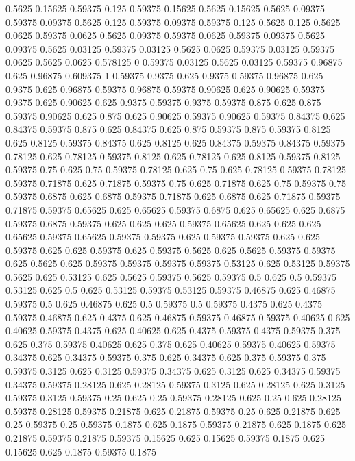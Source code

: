 0.5625 0.15625
0.59375 0.125
0.59375 0.15625
0.5625 0.15625
0.5625 0.09375
0.59375 0.09375
0.5625 0.125
0.59375 0.09375
0.59375 0.125
0.5625 0.125
0.5625 0.0625
0.59375 0.0625
0.5625 0.09375
0.59375 0.0625
0.59375 0.09375
0.5625 0.09375
0.5625 0.03125
0.59375 0.03125
0.5625 0.0625
0.59375 0.03125
0.59375 0.0625
0.5625 0.0625
0.578125 0
0.59375 0.03125
0.5625 0.03125
0.59375 0.96875
0.625 0.96875
0.609375 1
0.59375 0.9375
0.625 0.9375
0.59375 0.96875
0.625 0.9375
0.625 0.96875
0.59375 0.96875
0.59375 0.90625
0.625 0.90625
0.59375 0.9375
0.625 0.90625
0.625 0.9375
0.59375 0.9375
0.59375 0.875
0.625 0.875
0.59375 0.90625
0.625 0.875
0.625 0.90625
0.59375 0.90625
0.59375 0.84375
0.625 0.84375
0.59375 0.875
0.625 0.84375
0.625 0.875
0.59375 0.875
0.59375 0.8125
0.625 0.8125
0.59375 0.84375
0.625 0.8125
0.625 0.84375
0.59375 0.84375
0.59375 0.78125
0.625 0.78125
0.59375 0.8125
0.625 0.78125
0.625 0.8125
0.59375 0.8125
0.59375 0.75
0.625 0.75
0.59375 0.78125
0.625 0.75
0.625 0.78125
0.59375 0.78125
0.59375 0.71875
0.625 0.71875
0.59375 0.75
0.625 0.71875
0.625 0.75
0.59375 0.75
0.59375 0.6875
0.625 0.6875
0.59375 0.71875
0.625 0.6875
0.625 0.71875
0.59375 0.71875
0.59375 0.65625
0.625 0.65625
0.59375 0.6875
0.625 0.65625
0.625 0.6875
0.59375 0.6875
0.59375 0.625
0.625 0.625
0.59375 0.65625
0.625 0.625
0.625 0.65625
0.59375 0.65625
0.59375 0.59375
0.625 0.59375
0.59375 0.625
0.625 0.59375
0.625 0.625
0.59375 0.625
0.59375 0.5625
0.625 0.5625
0.59375 0.59375
0.625 0.5625
0.625 0.59375
0.59375 0.59375
0.59375 0.53125
0.625 0.53125
0.59375 0.5625
0.625 0.53125
0.625 0.5625
0.59375 0.5625
0.59375 0.5
0.625 0.5
0.59375 0.53125
0.625 0.5
0.625 0.53125
0.59375 0.53125
0.59375 0.46875
0.625 0.46875
0.59375 0.5
0.625 0.46875
0.625 0.5
0.59375 0.5
0.59375 0.4375
0.625 0.4375
0.59375 0.46875
0.625 0.4375
0.625 0.46875
0.59375 0.46875
0.59375 0.40625
0.625 0.40625
0.59375 0.4375
0.625 0.40625
0.625 0.4375
0.59375 0.4375
0.59375 0.375
0.625 0.375
0.59375 0.40625
0.625 0.375
0.625 0.40625
0.59375 0.40625
0.59375 0.34375
0.625 0.34375
0.59375 0.375
0.625 0.34375
0.625 0.375
0.59375 0.375
0.59375 0.3125
0.625 0.3125
0.59375 0.34375
0.625 0.3125
0.625 0.34375
0.59375 0.34375
0.59375 0.28125
0.625 0.28125
0.59375 0.3125
0.625 0.28125
0.625 0.3125
0.59375 0.3125
0.59375 0.25
0.625 0.25
0.59375 0.28125
0.625 0.25
0.625 0.28125
0.59375 0.28125
0.59375 0.21875
0.625 0.21875
0.59375 0.25
0.625 0.21875
0.625 0.25
0.59375 0.25
0.59375 0.1875
0.625 0.1875
0.59375 0.21875
0.625 0.1875
0.625 0.21875
0.59375 0.21875
0.59375 0.15625
0.625 0.15625
0.59375 0.1875
0.625 0.15625
0.625 0.1875
0.59375 0.1875

